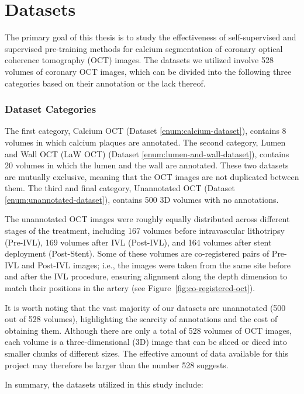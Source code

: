 \documentclass[a4paper,11pt,oneside]{report}
\begin{document}

\section{Datasets}\label{sec:design:datasets}
The primary goal of this thesis is to study the effectiveness of self-supervised and supervised pre-training methods for calcium segmentation of coronary optical coherence tomography (OCT) images. The datasets we utilized involve 528 volumes of coronary OCT images, which can be divided into the following three categories based on their annotation or the lack thereof. 

\subsubsection{Dataset Categories}

The first category, Calcium OCT (Dataset \ref{enum:calcium-dataset}), contains 8 volumes in which calcium plaques are annotated. The second category, Lumen and Wall OCT (LaW OCT) (Dataset \ref{enum:lumen-and-wall-dataset}), contains 20 volumes in which the lumen and the wall are annotated. These two datasets are mutually exclusive, meaning that the OCT images are not duplicated between them. The third and final category, Unannotated OCT (Dataset \ref{enum:unannotated-dataset}), contains 500 3D volumes with no annotations. 

The unannotated OCT images were roughly equally distributed across different stages of the treatment, including 167 volumes before intravascular lithotripsy (Pre-IVL), 169 volumes after IVL (Post-IVL), and 164 volumes after stent deployment (Post-Stent). Some of these volumes are co-registered pairs of Pre-IVL and Post-IVL images; i.e., the images were taken from the same site before and after the IVL procedure, ensuring alignment along the depth dimension to match their positions in the artery (see Figure~\ref{fig:co-registered-oct}). 

It is worth noting that the vast majority of our datasets are unannotated (500 out of 528 volumes), highlighting the scarcity of annotations and the cost of obtaining them. Although there are only a total of 528 volumes of OCT images, each volume is a three-dimensional (3D) image that can be sliced or diced into smaller chunks of different sizes. The effective amount of data available for this project may therefore be larger than the number 528 suggests. 

In summary, the datasets utilized in this study include:
\end{document}
